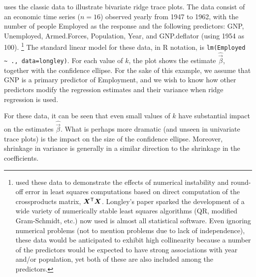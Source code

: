  uses the classic \citet{Longley:1967}
data to illustrate
bivariate ridge trace plots.  The data consist of an economic time series ($n=16$)
observed yearly from 1947 to 1962, with the number of people Employed as the
response and the following predictors:
GNP, Unemployed,  Armed.Forces,  Population,  Year, and GNP.deflator (using
1954 as 100).%
\footnote{
\citet{Longley:1967} used these data to demonstrate the effects of
numerical instability and round-off error in least squares computations
based on direct computation of the crossproducts matrix, $\bm{X}^\mathsf{T}\bm{X}$.
Longley's paper sparked the development of a wide variety of
numerically stable least squares algorithms (QR, modified Gram-Schmidt, etc.)
now used is almost all statistical software.
Even ignoring numerical problems
(not to mention problems due to lack of independence), these
data would be anticipated to exhibit high collinearity because
a number of the predictors would be expected to have strong associations
with year and/or population, yet both of these are also included among the
predictors.
}
The standard linear model for these data, in R notation,
is \verb|lm(Employed ~ ., data=longley)|.  For each value of $k$, the plot
shows the estimate $\widehat{\vec{\beta}}$, together with the confidence
ellipse.  For the sake of this example, we assume that GNP is a primary
predictor of Employment, and we wish to know how other predictors modify the
regression estimates and their variance when ridge regression is used.

For these data, it can be seen that even small values of $k$ have substantial
impact on the estimates $\widehat{\vec{\beta}}$. What is perhaps more dramatic
(and unseen in univariate trace plots) is the impact on the size of the confidence
ellipse.  Moreover, shrinkage in variance is generally in a similar direction to the
shrinkage in the coefficients.
